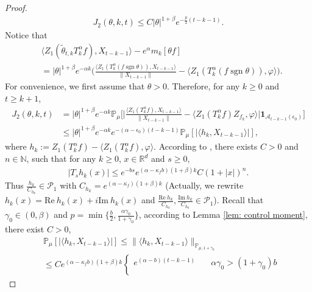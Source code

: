 \documentclass[12pt,oneside,english]{amsart}
\theoremstyle{plain}
\theoremstyle{definition}
\numberwithin{equation}{section}
\newcommand{\added}[1]{{\color{blue}#1}}\newcommand{\deleted}[1]{{\color{red}#1}}
\begin{document}
\begin{proof}
\begin{align}
\label{eq:31step3}
    J_2(\theta,k,t)\leq C|\theta|^{1+\beta} e^{-\frac{p}{2}(t-k-1)}.
\end{align}
    Notice that
    \begin{align}
          &\langle Z_1(\tilde{\theta}_{t,k}T_k^{\alpha}f),X_{t-k-1}\rangle-e^{\alpha}m_k[\theta f]
          \\&=|\theta|^{1+\beta}e^{-\alpha k}\Big(\frac{\langle Z_1(T_k^{\alpha}(f \operatorname{sgn} \theta)),X_{t-k-1}\rangle}{\|X_{t-k-1}\|}-\langle  Z_1(T_k^{\alpha}(f \operatorname{sgn} \theta)),\varphi\rangle\Big). 
    \end{align}
For convenience, we first assume that $\theta>0$. Therefore, for any $k\geq 0$ and $t\geq k+1$,
\begin{align}
J_2(\theta,k,t)
    &=|\theta|^{1+\beta}e^{-\alpha k}\mathbb{P}_{\mu}\Big[\Big|\frac{\langle Z_1(T^{\alpha}_k f),X_{t-k-1}\rangle}{\|X_{t-k-1}\|}-\langle  Z_1(T^{\alpha}_k f)Z_{f_k},\varphi\rangle\Big|\mathbf{1}_{\mathcal{A}_{t-k-1}(\epsilon_0)}\Big]\nonumber\\
    &\leq |\theta|^{1+\beta}e^{-\alpha k}e^{-(\alpha-\epsilon_0)(t-k-1)}\mathbb{P}_{\mu}\left[\left|\langle h_k,X_{t-k-1}\rangle\right|\right],\label{II1}
\end{align}
where $h_k:= Z_1(T^{\alpha}_k f)-\langle  Z_1(T^{\alpha}_k f),\varphi\rangle$. According to \cite[Lemma 2.8]{MM}, there exists $C>0$ and $n\in\mathbb{N}$, such that for any $k\geq 0$, $x\in \mathbb{R}^d$ and $s\geq 0$,
 \begin{align}
 \label{eq:31step2}
     |T_s h_k(x)|\leq e^{-bs}e^{(\alpha-\kappa_fb)(1+\beta)k}C(1+|x|)^n.
 \end{align}
\added{
Thus $\frac{h_k}{C_{h_k}} \in \mathcal{P}_{1}$ with $C_{h_k}=e^{(\alpha-\kappa_f)(1+\beta)k}$ (Actually, we rewrite $h_k(x)=\text{Re}~h_k(x)+i \text{Im} ~h_k(x)$ and $\frac{\text{Re}~h_k}{C_{h_k}},\frac{\text{Im}~h_k}{C_{h_k}}\in \mathcal{P}_1$). Recall that $\gamma_0\in(0,\beta)$ and $p=\min\{\frac{b}{2},\frac{\alpha\gamma_0}{1+\gamma_0}\}$, according to Lemma \ref{lem: control moment}, there exist $C>0$,
\begin{align}
    &\mathbb{P}_{\mu}\left[\left|\langle h_k,X_{t-k-1}\rangle\right|\right]\leq \|\langle h_k, X_{t-k-1}\rangle\|_{\mathbb{P}_{\mu,1+\gamma_0}}\\
    &\leq C e^{(\alpha-\kappa_fb)(1+\beta)k}
    \begin{cases}
    e^{(\alpha-b)(t-k-1)}\quad &\alpha\gamma_0>(1+\gamma_0)b\\

\end{cases}
\end{align}}
\end{proof}
\end{document}
